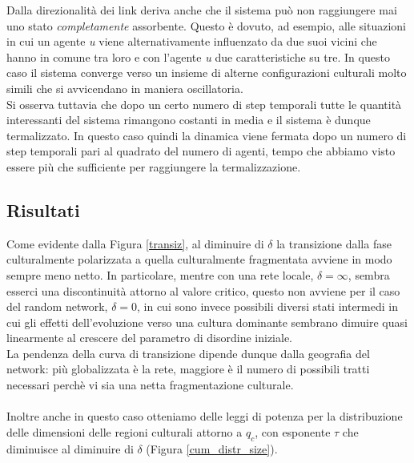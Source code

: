 \documentclass[a4paper,12pt]{article}
\begin{document}
Dalla direzionalit\`a dei link  deriva anche che il sistema pu\`{o} non raggiungere mai uno stato \textit{completamente} assorbente. Questo \`{e} dovuto, ad esempio, alle situazioni in cui un agente \textit{u} viene alternativamente influenzato da due suoi vicini che hanno in comune tra loro e con l'agente \textit{u} due caratteristiche su tre. In questo caso il sistema converge verso un insieme di alterne configurazioni culturali molto simili che si avvicendano in maniera oscillatoria.
\\Si osserva tuttavia che dopo un certo numero di step temporali tutte le quantit\`{a} interessanti del sistema rimangono costanti in media e il sistema \`{e} dunque termalizzato. In questo caso quindi la dinamica viene fermata dopo un numero di step temporali pari al quadrato del numero di agenti, tempo che abbiamo visto essere pi\`{u} che sufficiente per raggiungere la termalizzazione.

\subsection{Risultati}
Come evidente dalla Figura \ref{transiz}, al diminuire di $\delta$ la transizione dalla fase culturalmente polarizzata a quella culturalmente fragmentata avviene in modo sempre meno netto. In particolare,  mentre con una rete locale, $\delta = \infty$, sembra esserci una discontinuit\`a attorno al valore critico,  questo non avviene per il caso del random network, $\delta=0$, in cui sono invece possibili diversi stati intermedi in cui gli effetti dell'evoluzione verso una cultura dominante sembrano dimuire quasi linearmente al crescere del parametro di disordine iniziale. \\
La pendenza della curva di transizione dipende dunque dalla geografia del network: pi\`{u} globalizzata \`{e} la rete, maggiore \`{e} il numero di possibili tratti necessari perch\`{e} vi sia una netta fragmentazione culturale. \\
\\Inoltre anche in questo caso otteniamo delle leggi di potenza per la distribuzione delle dimensioni delle regioni culturali attorno a $q_c$, con esponente $\tau$ che diminuisce al diminuire di $\delta$ (Figura \ref{cum_distr_size}).
\end{document}

